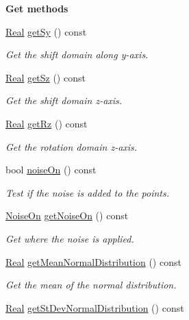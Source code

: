 \begin{Indent}{\bf Get methods}
\begin{DoxyCompactItemize}
\hyperlink{namespaceFVCode3D_a40c1f5588a248569d80aa5f867080e83}{Real} \hyperlink{classFVCode3D_1_1Data_a3e88f00500723ed940032b623c2692b5}{get\+Sy} () const 
\begin{DoxyCompactList}\small\item\em Get the shift domain along y-\/axis. \end{DoxyCompactList}\item 
\hyperlink{namespaceFVCode3D_a40c1f5588a248569d80aa5f867080e83}{Real} \hyperlink{classFVCode3D_1_1Data_a602548727f2e41ee9d2351ce80cff5ba}{get\+Sz} () const 
\begin{DoxyCompactList}\small\item\em Get the shift domain z-\/axis. \end{DoxyCompactList}\item 
\hyperlink{namespaceFVCode3D_a40c1f5588a248569d80aa5f867080e83}{Real} \hyperlink{classFVCode3D_1_1Data_aea35270ca37a956c72ba5f1d6fe9214f}{get\+Rz} () const 
\begin{DoxyCompactList}\small\item\em Get the rotation domain z-\/axis. \end{DoxyCompactList}\item 
bool \hyperlink{classFVCode3D_1_1Data_ad19041278d7cb67b1d68665a3470fded}{noise\+On} () const 
\begin{DoxyCompactList}\small\item\em Test if the noise is added to the points. \end{DoxyCompactList}\item 
\hyperlink{classFVCode3D_1_1Data_a983fdc14aa355a7c9fd614b9655a3552}{Noise\+On} \hyperlink{classFVCode3D_1_1Data_a6119d80c2fb6b2c332f9e041a908d83f}{get\+Noise\+On} () const 
\begin{DoxyCompactList}\small\item\em Get where the noise is applied. \end{DoxyCompactList}\item 
\hyperlink{namespaceFVCode3D_a40c1f5588a248569d80aa5f867080e83}{Real} \hyperlink{classFVCode3D_1_1Data_a0fa514fe74511259474538d028549bb0}{get\+Mean\+Normal\+Distribution} () const 
\begin{DoxyCompactList}\small\item\em Get the mean of the normal distribution. \end{DoxyCompactList}\item 
\hyperlink{namespaceFVCode3D_a40c1f5588a248569d80aa5f867080e83}{Real} \hyperlink{classFVCode3D_1_1Data_a63dcf3d2a71d71a1f25418311297ae06}{get\+St\+Dev\+Normal\+Distribution} () const 

\end{DoxyCompactItemize}
\end{Indent}
